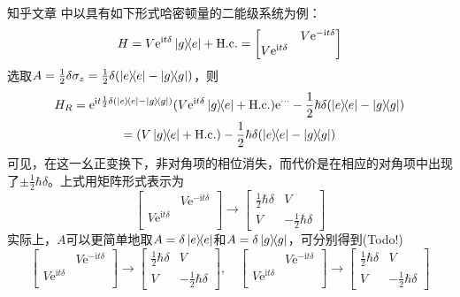 \documentclass[
fontsetup = font-setup-open.tex,
titlesetup = titles-setup.tex
]{AJbook}
\numberwithin{equation}{section}
\begin{document}
知乎文章 \cite{355327986} 中以具有如下形式哈密顿量的二能级系统为例：
\begin{equation}\label{key}
H=V\mathrm{e}^{\mathrm{i}t\delta}\ketbra{g}{e}+\mathrm{H.c.}
=\begin{bmatrix}
              & V\mathrm{e}^{-\mathrm{i}t\delta} \\
V\mathrm{e}^{\mathrm{i}t\delta} &                                  \\
\end{bmatrix}
\end{equation}
选取$ A= \frac{1}{2}\delta\sigma_z=\frac{1}{2}\delta(\ketbra{e}{e}-\ketbra{g}{g}) $，则
\begin{equation}\label{key}
\begin{gathered}
H_R=\mathrm{e}^{\mathrm{i}t\frac{1}{2}\delta(\ketbra{e}{e}-\ketbra{g}{g})}(V\mathrm{e}^{\mathrm{i}t\delta}\ketbra{g}{e}+\mathrm{H.c.})\mathrm{e}^{\cdots}-\frac{1}{2}\hbar\delta(\ketbra{e}{e}-\ketbra{g}{g})\\
=(V\ketbra{g}{e}+\mathrm{H.c.})-\frac{1}{2}\hbar\delta(\ketbra{e}{e}-\ketbra{g}{g})
\end{gathered}
\end{equation}
可见，在这一幺正变换下，非对角项的相位消失，而代价是在相应的对角项中出现了$ \pm\frac{1}{2}\hbar\delta $。上式用矩阵形式表示为
\begin{equation}\label{key}
\begin{bmatrix}
              & V\mathrm{e}^{-\mathrm{i}t\delta} \\
V\mathrm{e}^{\mathrm{i}t\delta} &                                  \\
\end{bmatrix}\to
\begin{bmatrix}
\frac{1}{2}\hbar\delta & V                       \\
V                      & -\frac{1}{2}\hbar\delta
\end{bmatrix}
\end{equation}
实际上，$ A $可以更简单地取$ A= \delta\ketbra{e}{e} $和$ A= \delta\ketbra{g}{g} $，可分别得到(Todo!)
\begin{equation}\label{key}
\begin{bmatrix}
              & V\mathrm{e}^{-\mathrm{i}t\delta} \\
V\mathrm{e}^{\mathrm{i}t\delta} &                                  \\
\end{bmatrix}\to
\begin{bmatrix}
\frac{1}{2}\hbar\delta & V                       \\
V                      & -\frac{1}{2}\hbar\delta
\end{bmatrix},\quad
\begin{bmatrix}
              & V\mathrm{e}^{-\mathrm{i}t\delta} \\
V\mathrm{e}^{\mathrm{i}t\delta} &                                  \\
\end{bmatrix}\to
\begin{bmatrix}
\frac{1}{2}\hbar\delta & V                       \\
V                      & -\frac{1}{2}\hbar\delta
\end{bmatrix}
\end{equation}
\end{document}
